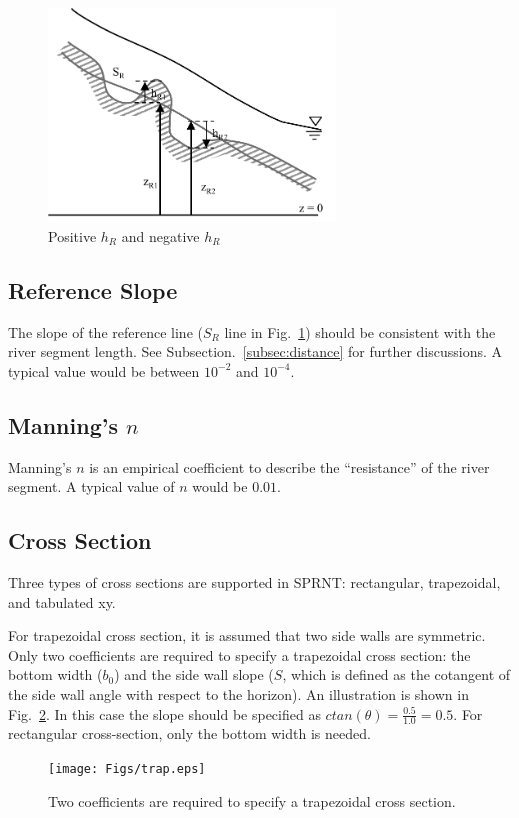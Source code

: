 \documentclass[10pt, letterpaper]{article}
\def\epswidth{3.0in}
\begin{document}
\begin{figure}[hbt]
\centerline{
\includegraphics[width=\epswidth, keepaspectratio=true]{Figs/xsec_sideway.pdf}  
}
\caption{Positive $h_R$ and negative $h_R$}
\label{fig:sideway}
\end{figure}


\subsection{Reference Slope}
\label{subsec:bottoms}
The slope of the reference line ($S_R$ line in Fig.~\ref{fig:sideway}) should be consistent with
the river segment length. See Subsection.~\ref{subsec:distance} for further discussions. A
typical value would be between $10^{-2}$ and $10^{-4}$.

\subsection{Manning's $n$}
\label{subsec:manning}
Manning's $n$ is an empirical coefficient to describe the ``resistance'' of the river
segment. A typical value of $n$ would be $0.01$.

\subsection{Cross Section}
\label{subsec:xsec}
Three types of cross sections are supported in SPRNT: rectangular, trapezoidal, and
tabulated xy.

For trapezoidal cross section, it is assumed that two side walls are symmetric. Only two
coefficients are required to specify a trapezoidal cross section: the bottom width
($b_0$) and the side wall slope ($S$, which is defined as the cotangent of the side wall
angle with respect to the horizon). An illustration is shown in Fig.~\ref{fig:trap}. In
this case the slope should be specified as $ctan(\theta)=\frac{0.5}{1.0}=0.5$. For
rectangular cross-section, only the bottom width is needed.
\begin{figure}[hbt]
\centerline{
\texttt{[image: Figs/trap.eps]}  
}
\caption{Two coefficients are required to specify a trapezoidal cross section.}
\label{fig:trap}
\end{figure}
\end{document}
